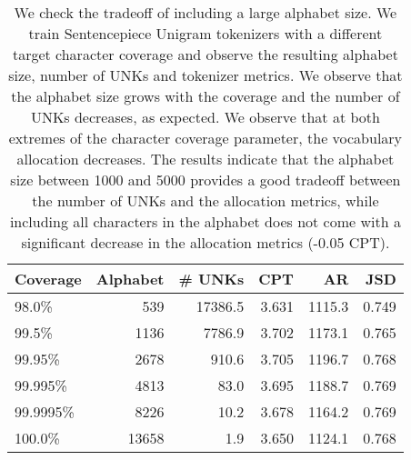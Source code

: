 \begin{table}
\caption{We check the tradeoff of including a large alphabet size. We train Sentencepiece Unigram tokenizers with a different target character coverage and observe the resulting alphabet size, number of UNKs and tokenizer metrics. We observe that the alphabet size grows with the coverage and the number of UNKs decreases, as expected. We observe that at both extremes of the character coverage parameter, the vocabulary allocation decreases. The results indicate that the alphabet size between 1000 and 5000 provides a good tradeoff between the number of UNKs and the allocation metrics, while including all characters in the alphabet does not come with a significant decrease in the allocation metrics (-0.05 CPT).}
\label{tab:coverage_influence}
\begin{tabular}{lrrrrr}
\toprule
Coverage & Alphabet & \# UNKs & CPT & AR & JSD \\
\midrule
98.0\% & 539 & 17386.5 & 3.631 & 1115.3 & 0.749 \\
99.5\% & 1136 & 7786.9 & 3.702 & 1173.1 & 0.765 \\
99.95\% & 2678 & 910.6 & 3.705 & 1196.7 & 0.768 \\
99.995\% & 4813 & 83.0 & 3.695 & 1188.7 & 0.769 \\
99.9995\% & 8226 & 10.2 & 3.678 & 1164.2 & 0.769 \\
100.0\% & 13658 & 1.9 & 3.650 & 1124.1 & 0.768 \\
\bottomrule
\end{tabular}
\end{table}
